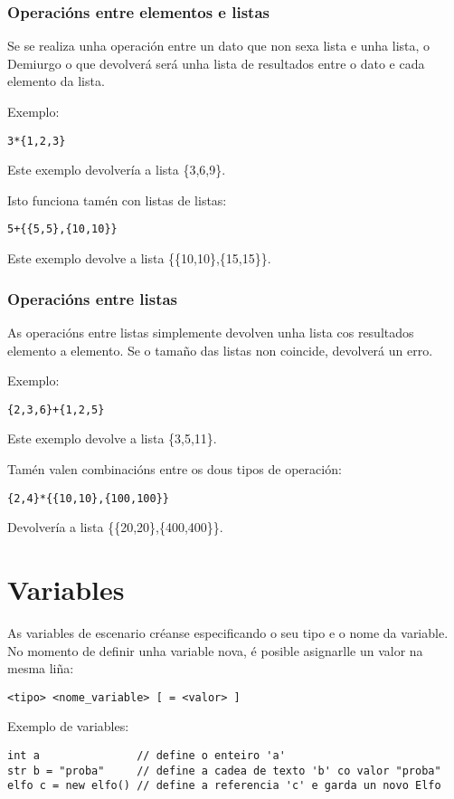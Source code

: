 \subsubsection{Operacións entre elementos e listas}
Se se realiza unha operación entre un dato que non sexa lista e unha lista, o
Demiurgo o que devolverá será unha lista de resultados entre o dato e cada
elemento da lista.
\par Exemplo:
\begin{lstlisting}
3*{1,2,3}
\end{lstlisting}
\par Este exemplo devolvería a lista \{3,6,9\}.
\par Isto funciona tamén con listas de listas:
\begin{lstlisting}
5+{{5,5},{10,10}}
\end{lstlisting}
\par Este exemplo devolve a lista \{\{10,10\},\{15,15\}\}.
\subsubsection{Operacións entre listas}
As operacións entre listas simplemente devolven unha lista cos resultados
elemento a elemento. Se o tamaño das listas non coincide, devolverá un erro.
\par Exemplo:
\begin{lstlisting}
{2,3,6}+{1,2,5}
\end{lstlisting}
\par Este exemplo devolve a lista \{3,5,11\}.
\par Tamén valen combinacións entre os dous tipos de operación:
\begin{lstlisting}
{2,4}*{{10,10},{100,100}}
\end{lstlisting}
\par Devolvería a lista \{\{20,20\},\{400,400\}\}.

\section{Variables}
As variables de escenario créanse especificando o seu tipo e o nome da variable.
No momento de definir unha variable nova, é posible asignarlle un valor na mesma
liña:
\begin{lstlisting}
<tipo> <nome_variable> [ = <valor> ]
\end{lstlisting}
\par Exemplo de variables:
\begin{lstlisting}
int a               // define o enteiro 'a'
str b = "proba"     // define a cadea de texto 'b' co valor "proba"
elfo c = new elfo() // define a referencia 'c' e garda un novo Elfo 
\end{lstlisting}

